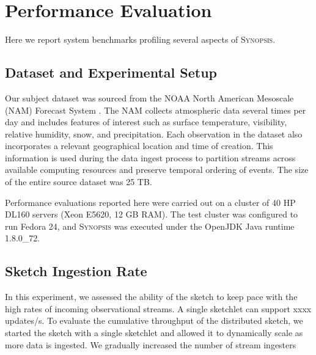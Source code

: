 \section{Performance Evaluation}
Here we report system benchmarks profiling several aspects of \textsc{Synopsis}.
\label{sec:performance}
\subsection{Dataset and Experimental Setup}
Our subject dataset was sourced from the NOAA North American Mesoscale (NAM) Forecast System \cite{noaa_nam}.  The NAM collects atmospheric data several times per day and includes features of interest such as surface temperature, visibility, relative humidity, snow, and precipitation. Each observation in the dataset also incorporates a relevant geographical location and time of creation. This information is used during the data ingest process to partition streams across available computing resources and preserve temporal ordering of events. The size of the entire source dataset was 25 TB.

Performance evaluations reported here were carried out on a cluster of 40 HP DL160 servers (Xeon E5620, 12 GB RAM). The test cluster was configured to run Fedora 24, and \textsc{Synopsis} was executed under the OpenJDK Java runtime 1.8.0\_72.

\subsection{Sketch Ingestion Rate}
In this experiment, we assessed the ability of the sketch to keep pace with the high rates of incoming observational streams.
A single sketchlet can support xxxx updates/s.
To evaluate the cumulative throughput of the distributed sketch, we started the sketch with a single sketchlet and allowed it to dynamically scale as more data is ingested.
We gradually increased the number of stream ingesters 

